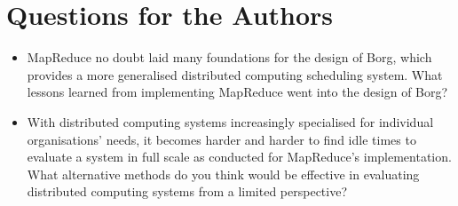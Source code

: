\documentclass[11pt]{article}
\begin{document}
\section*{Questions for the Authors}

\begin{itemize}
	\item MapReduce no doubt laid many foundations for the design of Borg, which provides a more generalised distributed computing scheduling system. What lessons learned from implementing MapReduce went into the design of Borg?
	\item With distributed computing systems increasingly specialised for individual organisations' needs, it becomes harder and harder to find idle times to evaluate a system in full scale as conducted for MapReduce's implementation. What alternative methods do you think would be effective in evaluating distributed computing systems from a limited perspective?
\end{itemize}


\footnotesize{}
\end{document}

